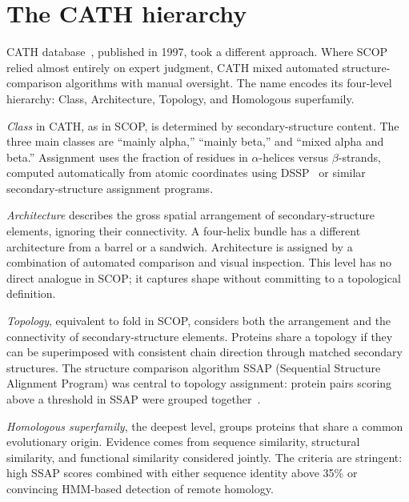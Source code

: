 \section{The CATH hierarchy}
\label{sec:cath}

 CATH database~\cite{orengo1997}, published in
1997, took a different approach. Where SCOP relied almost entirely on expert
judgment, CATH mixed automated structure-comparison algorithms with manual
oversight. The name encodes its four-level hierarchy: Class, Architecture,
Topology, and Homologous superfamily.

\emph{Class} in CATH, as in SCOP, is determined by secondary-structure content.
The three main classes are ``mainly alpha,'' ``mainly beta,'' and ``mixed alpha
and beta.'' Assignment uses the fraction of residues in $\alpha$-helices versus
$\beta$-strands, computed automatically from atomic coordinates using DSSP~\cite{kabsch1983} or
similar secondary-structure assignment programs.

\emph{Architecture} describes the gross spatial arrangement of secondary-structure
elements, ignoring their connectivity. A four-helix bundle has a different
architecture from a barrel or a sandwich. Architecture is assigned by a
combination of automated comparison and visual inspection. This level has no
direct analogue in SCOP; it captures shape without committing to a topological
definition.

\emph{Topology}, equivalent to fold in SCOP, considers both the arrangement and
the connectivity of secondary-structure elements. Proteins share a topology if
they can be superimposed with consistent chain direction through matched secondary
structures. The structure comparison algorithm SSAP (Sequential Structure
Alignment Program) was central to topology assignment: protein pairs scoring above
a threshold in SSAP were grouped together~\cite{taylor1990}.

\emph{Homologous superfamily}, the deepest level, groups proteins that share a
common evolutionary origin. Evidence comes from sequence similarity, structural
similarity, and functional similarity considered jointly. The criteria are
stringent: high SSAP scores combined with either sequence identity above 35\% or
convincing HMM-based detection of remote homology.

